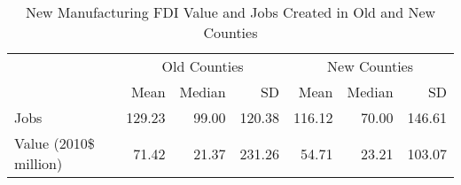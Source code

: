 \begin{table}

\caption{New Manufacturing FDI Value and Jobs Created in Old and New Counties}
\centering
\begin{tabular}[t]{lrrrrrr}
\toprule
\multicolumn{1}{c}{ } & \multicolumn{3}{c}{Old Counties} & \multicolumn{3}{c}{New Counties} \\
\cmidrule(l{3pt}r{3pt}){2-4} \cmidrule(l{3pt}r{3pt}){5-7}
  & Mean & Median & SD & Mean & Median & SD\\
\midrule
Jobs & 129.23 & 99.00 & 120.38 & 116.12 & 70.00 & 146.61\\
Value (2010\$ million) & 71.42 & 21.37 & 231.26 & 54.71 & 23.21 & 103.07\\
\bottomrule
\end{tabular}
\end{table}
